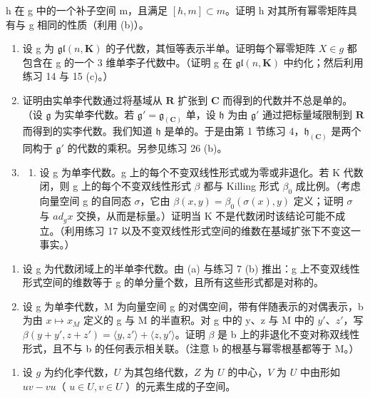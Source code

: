h 在 g 中的一个补子空间 m，且满足 \([h, m] \subset m\)。证明 h 对其所有幂零矩阵具有与 g 相同的性质（利用 (b)）。

\begin{enumerate}
\def\labelenumi{\arabic{enumi}.}
\setcounter{enumi}{15}
\item
  设 g 为 \(\mathfrak{gl}(n,\mathbf{K})\) 的子代数，其恒等表示半单。证明每个幂零矩阵 \(X\in g\) 都包含在 g 的一个 3 维单李子代数中。（证明 g 在 \(\mathfrak{gl}(n,\mathbf{K})\) 中约化；然后利用练习 14 与 15 (c)。）
\item
  证明由实单李代数通过将基域从 \(\mathbf{R}\) 扩张到 \(\mathbf{C}\) 而得到的代数并不总是单的。（设 \(\mathfrak{g}\) 为实单李代数。若 \(\mathfrak{g}' = \mathfrak{g}_{(\mathbf{C})}\) 单，设 \(\mathfrak{h}\) 为由 \(\mathfrak{g}'\) 通过把标量域限制到 \(\mathbf{R}\) 而得到的实李代数。我们知道 \(\mathfrak{h}\) 是单的。于是由第 1 节练习 4，\(\mathfrak{h}_{(\mathbf{C})}\) 是两个同构于 \(\mathfrak{g}'\) 的代数的乘积。另参见练习 26 (b)。
\item
  \begin{enumerate}
  \def\labelenumii{(\alph{enumii})}
  \tightlist
  \item
    设 g 为单李代数。g 上的每个不变双线性形式或为零或非退化。若 K 代数闭，则 g 上的每个不变双线性形式 \(\beta\) 都与 Killing 形式 \(\beta_{0}\) 成比例。（考虑向量空间 g 的自同态 \(\sigma\)，它由 \(\beta(x,y)=\beta_{0}(\sigma(x),y)\) 定义；证明 \(\sigma\) 与 \(ad_{g}x\) 交换，从而是标量。）证明当 K 不是代数闭时该结论可能不成立。（利用练习 17 以及不变双线性形式空间的维数在基域扩张下不变这一事实。）
  \end{enumerate}
\end{enumerate}

\begin{enumerate}
\def\labelenumi{(\alph{enumi})}
\setcounter{enumi}{1}
\item
  设 g 为代数闭域上的半单李代数。由 (a) 与练习 7 (b) 推出：g 上不变双线性形式空间的维数等于 g 的单分量个数，且所有这些形式都是对称的。
\item
  设 g 为单李代数，M 为向量空间 g 的对偶空间，带有伴随表示的对偶表示，b 为由 \(x \mapsto x_{M}\) 定义的 g 与 M 的半直积。对 g 中的 y、z 与 M 中的 \(y'\)、\(z'\)，写 \(\beta(y + y', z + z') = \langle y, z' \rangle + \langle z, y' \rangle\)。证明 \(\beta\) 是 b 上的非退化不变对称双线性形式，且不与 b 的任何表示相关联。（注意 b 的根基与幂零根基都等于 M。）
\end{enumerate}

\begin{enumerate}
\def\labelenumi{\arabic{enumi}.}
\setcounter{enumi}{18}
\tightlist
\item
  设 \(g\) 为约化李代数，\(U\) 为其包络代数，\(Z\) 为 \(U\) 的中心，\(V\) 为 \(U\) 中由形如 \(uv - vu\)（ \(u \in U, v \in U\) ）的元素生成的子空间。
\end{enumerate}

